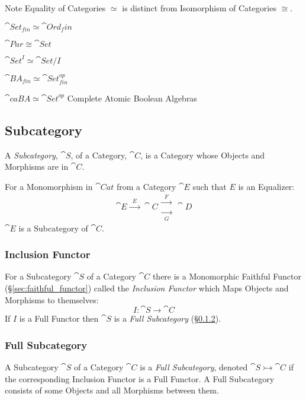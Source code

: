 \fist Note Equality of Categories $\simeq$ is distinct from
Isomorphism of Categories $\cong$.

$\cat{Set}_{fin} \simeq \cat{Ord}_fin$

$\cat{Par} \cong \cat{Set}$

$\cat{Set}^I \simeq \cat{Set}/I$

$\cat{BA}_{fin} \simeq \cat{Set}_{fin}^{op}$

$\cat{caBA} \simeq \cat{Set}^{op}$ Complete Atomic Boolean
Algebras %



\subsection{Subcategory}\label{sec:subcategory}

A \emph{Subcategory}, $\cat{S}$, of a Category, $\cat{C}$, is a
Category whose Objects and Morphisms are in $\cat{C}$.

For a Monomorphism in $\cat{Cat}$ from a Category $\cat{E}$ such
that $E$ is an Equalizer:
\[
  \cat{E} \xrightarrow{\;\;E\;\;} \cat{C}
  \begin{matrix}
  \xrightarrow{\;\;F\;\;}\\
  \xrightarrow[\;\;G\;\;]{}
  \end{matrix}
  \cat{D}
\]
$\cat{E}$ is a Subcategory of $\cat{C}$.



\subsubsection{Inclusion Functor}\label{sec:inclusion_functor}

For a Subcategory $\cat{S}$ of a Category $\cat{C}$ there is a
Monomorphic Faithful Functor (\S\ref{sec:faithful_functor}) called the
\emph{Inclusion Functor} which Maps Objects and Morphisms to
themselves:
\[
  I : \cat{S} \rightarrow \cat{C}
\]
If $I$ is a Full Functor then $\cat{S}$ is a \emph{Full
  Subcategory} (\S\ref{sec:full_subcategory}).



\subsubsection{Full Subcategory}\label{sec:full_subcategory}

A Subcategory $\cat{S}$ of a Category $\cat{C}$ is a \emph{Full
  Subcategory}, denoted $\cat{S} \rightarrowtail \cat{C}$ if the
corresponding Inclusion Functor is a Full Functor. A Full Subcategory
consists of some Objects and all Morphisms between them.

